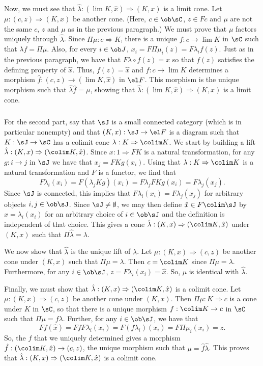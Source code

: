 \documentclass[../../main]{subfiles}
\begin{document}
Now, we must see that $\hat{\lambda}:(\lim K,\hat{x})\Rightarrow(K,x)$ is a
limit cone. Let $\mu:(c,z)\Rightarrow(K,x)$ be another cone. (Here,
$c\in\ob\sC$, $z\in Fc$ and $\mu$ are not the same $c$, $z$ and $\mu$ as in the
previous paragraph.) We must prove that $\mu$ factors uniquely through
$\hat{\lambda}$. Since $\Pi\mu:c\Rightarrow K$, there is a unique
$f:c\rightarrow\lim K$ in $\sC$ such  that $\lambda f=\Pi\mu$. Also, for every
$i\in\ob J$, $x_i=F\Pi\mu_i(z)=F\lambda_i f(z)$. Just as in the previous
paragraph, we have that $F\lambda\circ f(z)=x$ so that $f(z)$ satisfies the
defining property of $\hat{x}$. Thus, $f(z)=\hat{x}$ and $f:c\rightarrow\lim K$
determines a morphism $\hat{f}:(c,z)\rightarrow(\lim K,\hat{x})$ in $\el F$.
This morphism is the unique morphism such that $\hat{\lambda}\hat{f}=\mu$,
showing that $\hat{\lambda}:(\lim K,\hat{x})\Rightarrow(K,x)$ is a limit cone.

\subparagraph{}
For the second part, say that $\sJ$ is a small connected category (which is in particular nonempty) and that $(K,x):\sJ\rightarrow\el F$ is a diagram such that $K:\sJ\rightarrow\sC$ has a colimit cone $\lambda:K\Rightarrow\colim K$. We start by building a lift $\hat\lambda:(K,x)\Rightarrow(\colim K,\hat x)$. Since $x:1\Rightarrow FK$ is a natural transformation, for any $g:i\rightarrow j$ in $\sJ$ we have that $x_j=FKg(x_i)$. Using that $\lambda:K\Rightarrow\colim K$ is a natural transformation and $F$ is a functor, we find that
\[F\lambda_i(x_i)=F(\lambda_jKg)(x_i)=F\lambda_jFKg(x_i)=F\lambda_j(x_j).\]
Since $\sJ$ is connected, this implies that $F\lambda_i(x_i)=F\lambda_j(x_j)$ for arbitrary objects $i,j\in\ob\sJ$. Since $\sJ\ne\emptyset$, we may then define $\hat{x}\in F\colim\sJ$ by $\hat{x}=\lambda_i(x_i)$ for an arbitrary choice of $i\in\ob\sJ$ and the definition is independent of that choice. This gives a cone $\hat{\lambda}:(K,x)\Rightarrow(\colim K,\hat x)$ under $(K,x)$ such that $\Pi\hat{\lambda}=\lambda$.

We now show that $\hat{\lambda}$ is the unique lift of $\lambda$. Let
$\mu:(K,x)\Rightarrow(c,z)$ be another cone under $(K,x)$ such that
$\Pi\mu=\lambda$. Then $c=\colim K$ since $\Pi\mu=\lambda$. Furthermore, for any
$i\in\ob\sJ$, $z=F\lambda_i(x_i)=\hat{x}$. So, $\mu$ is identical with
$\hat\lambda$.

Finally, we must show that $\hat\lambda:(K,x)\Rightarrow(\colim K,\hat x)$ is a colimit cone. Let $\mu:(K,x)\Rightarrow(c,z)$ be another cone under $(K,x)$. Then $\Pi\mu:K\Rightarrow c$ is a cone under $K$ in $\sC$, so that there is a unique morphism $f:\colim K\rightarrow c$ in $\sC$ such that $\Pi\mu=f\lambda$. Further, for any $i\in\ob\sJ$, we have that
\[Ff(\hat{x})=FfF\lambda_i(x_i)=F(f\lambda_i)(x_i)=F\Pi\mu_i(x_i)=z.\]
So, the $f$ that we uniquely determined gives a morphism $\hat f:(\colim K,\hat x)\rightarrow(c,z)$, the unique morphism such that $\mu=\hat f\hat\lambda$. This proves that $\hat{\lambda}:(K,x)\Rightarrow(\colim K,\hat x)$ is a colimit cone.
\end{document}

